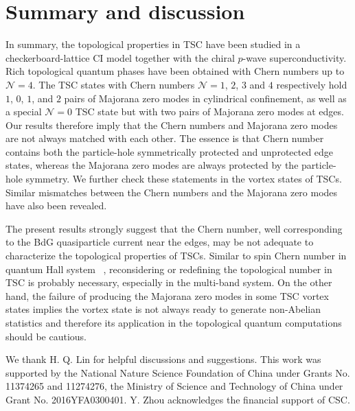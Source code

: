 \documentclass[12pt]{iopart}
\begin{document}
\section{Summary and discussion}
In summary, the topological properties in TSC have been studied in a checkerboard-lattice CI model together with the chiral $p$-wave superconductivity. Rich topological quantum phases have been obtained with Chern numbers up to $\mathcal{N}=4$. The TSC states with Chern numbers $\mathcal{N}=1$, $2$, $3$ and $4$  respectively hold $1$, $0$, $1$, and $2$ pairs of Majorana zero modes in cylindrical confinement, as well as a special $\mathcal{N}=0$ TSC state but with two pairs of Majorana zero modes at edges. Our results therefore imply that the Chern numbers and Majorana zero modes are not always matched with each other. The essence is that Chern number contains both the particle-hole symmetrically protected and unprotected edge states, whereas the Majorana zero modes are always protected by the particle-hole symmetry. We further check these statements in the vortex states of TSCs. Similar mismatches between the Chern numbers and the Majorana zero modes have also been revealed.

The present results strongly suggest that the Chern number, well corresponding to the BdG quasiparticle current near the edges, may be not adequate to characterize the topological properties of TSCs. Similar to spin Chern number in quantum Hall system ~\cite{ShengD-PRL2006}, reconsidering or redefining the topological number in TSC is probably necessary, especially in the multi-band system. On the other hand, the failure of producing the Majorana zero modes in some TSC vortex states implies the vortex state is not always ready to generate non-Abelian statistics and therefore its application in the topological quantum computations should be cautious.

\ack
We thank H. Q. Lin for helpful discussions and suggestions. This work was supported by the National Nature Science Foundation of China under Grants No. 11374265 and 11274276, the Ministry of Science and Technology of China under Grant No. 2016YFA0300401. Y. Zhou acknowledges the financial support of CSC.
\end{document}
